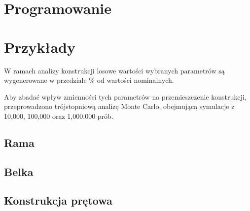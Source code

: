\newpage
\section{Programowanie}

\newpage
\section{Przykłady}

W ramach analizy konstrukcji losowe wartości wybranych parametrów są wygenerowane w przedziale \% od wartości nominalnych.

Aby zbadać wpływ zmienności tych parametrów na przemieszczenie konstrukcji, przeprowadzono trójstopniową analizę Monte Carlo,
obejmującą symulacje z 10,000, 100,000 oraz 1,000,000 prób.

\subsection{Rama}

\newpage
\subsection{Belka}

\newpage
\subsection{Konstrukcja prętowa}
